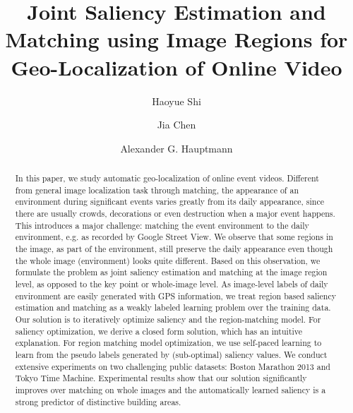 \documentclass[sigconf]{acmart}
\begin{document}
\title{Joint Saliency Estimation and Matching using Image Regions for Geo-Localization of Online Video}

\author{Haoyue Shi}

\author{Jia Chen}


\author{Alexander G. Hauptmann}
\renewcommand{\shorttitle}{JSEM using Image Regions for Geo-Localization for Online Video}

\begin{abstract}
In this paper, we study automatic geo-localization of online event videos. 
Different from general image localization task through matching, the appearance of an environment during significant events varies greatly from its daily appearance, since there are usually crowds, decorations or even destruction when a major event happens. 
This introduces a major challenge: matching the event environment to the daily environment, e.g. as recorded by Google Street View. 
We observe that some regions in the image, as part of the environment, still preserve the daily appearance even though the whole image (environment) looks quite different. 
Based on this observation, we formulate the problem as joint saliency estimation and matching at the image region level, as opposed to the key point or whole-image level. 
As image-level labels of daily environment are easily generated with GPS information, we treat region based saliency estimation and matching as a weakly labeled learning problem over the training data. 
Our solution is to iteratively optimize saliency and the region-matching model. 
For saliency optimization, we derive a closed form solution, which has an intuitive explanation. 
For region matching model optimization, we use self-paced learning to learn from the pseudo labels generated by (sub-optimal) saliency values. 
We conduct extensive experiments on two challenging public datasets: Boston Marathon 2013 and Tokyo Time Machine. 
Experimental results show that our solution significantly improves over matching on whole images and the automatically learned saliency is a strong predictor of distinctive building areas. 
\end{abstract}
\end{document}

